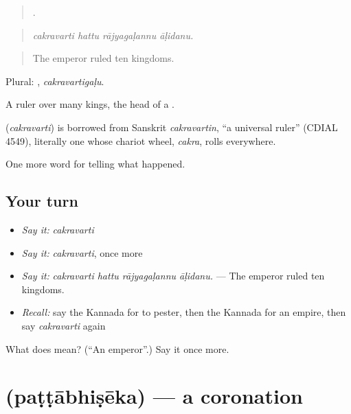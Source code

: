 \begin{quote}
   .
\end{quote}

\begin{quote}
\emph{cakravarti hattu rājyagaḷannu āḷidanu.}
\end{quote}

\begin{quote}
The emperor ruled ten kingdoms.
\end{quote}

Plural: , \emph{cakravartigaḷu}.

A ruler over many kings, the head of a .

\begin{cousinweb}
\textbf{} (\emph{cakravarti}) is borrowed from Sanskrit \emph{cakravartin}, \textquotedblleft{}a universal ruler\textquotedblright{} (CDIAL 4549), literally one whose chariot wheel, \emph{cakra}, rolls everywhere.
\end{cousinweb}

\begin{grammarlens}[title={What you've built}]
One more word for telling what happened.
\end{grammarlens}

\subsection*{Your turn}
\begin{itemize}
\raggedright
  \item \emph{Say it:} \emph{cakravarti}
  \item \emph{Say it:} \emph{cakravarti}, once more
  \item \emph{Say it:} \emph{cakravarti hattu rājyagaḷannu āḷidanu.} — The emperor ruled ten kingdoms.
  \item \emph{Recall:} say the Kannada for to pester, then the Kannada for an empire, then say \emph{cakravarti} again
\end{itemize}

\begin{tcolorbox}[breakable,colback=teal!4,colframe=teal!35!black,title={Before you move on}]
What does  mean? (\textquotedblleft{}An emperor\textquotedblright{}.) Say it once more.
\end{tcolorbox}
\section[\texorpdfstring{\kn{ಪಟ್ಟಾಭಿಷೇಕ} (paṭṭābhiṣēka)}{ಪಟ್ಟಾಭಿಷೇಕ (paṭṭābhiṣēka)}]{ (paṭṭābhiṣēka) — a coronation}

